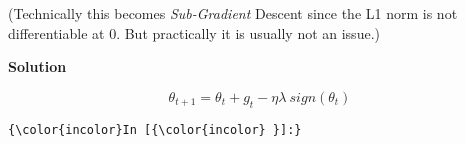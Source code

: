 \documentclass[11pt]{article}
\begin{document}
(Technically this becomes \emph{Sub-Gradient} Descent since the L1 norm
is not differentiable at 0. But practically it is usually not an issue.)

    \textbf{Solution}

\[\theta_{t+1} =  \theta_t + g_t - \eta  \lambda \ sign(\theta_t) \]

    \begin{Verbatim}[commandchars=\\\{\}]
{\color{incolor}In [{\color{incolor} }]:} 
\end{Verbatim}



    
    
    
    
\end{document}
